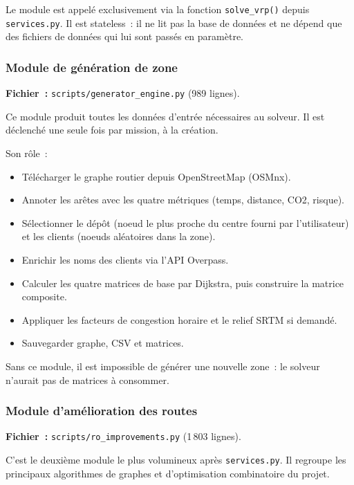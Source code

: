 \documentclass[a4paper, 12pt, twoside]{article}
\begin{document}
Le module est appel\'{e} exclusivement via la fonction \texttt{solve\_vrp()} depuis
\texttt{services.py}. Il est stateless~: il ne lit pas la base de donn\'{e}es et ne
d\'{e}pend que des fichiers de donn\'{e}es qui lui sont pass\'{e}s en param\`{e}tre.

\subsubsection{Module de g\'{e}n\'{e}ration de zone}

\textbf{Fichier~:} \texttt{scripts/generator\_engine.py} (989 lignes).

Ce module produit toutes les donn\'{e}es d'entr\'{e}e n\'{e}cessaires au solveur.
Il est d\'{e}clench\'{e} une seule fois par mission, \`{a} la cr\'{e}ation.

Son r\^{o}le~:
\begin{itemize}
  \item T\'{e}l\'{e}charger le graphe routier depuis OpenStreetMap (OSMnx).
  \item Annoter les ar\^{e}tes avec les quatre m\'{e}triques (temps, distance, CO2, risque).
  \item S\'{e}lectionner le d\'{e}p\^{o}t (noeud le plus proche du centre fourni par l'utilisateur) et les clients (noeuds al\'{e}atoires dans la zone).
  \item Enrichir les noms des clients via l'API Overpass.
  \item Calculer les quatre matrices de base par Dijkstra, puis construire la matrice composite.
  \item Appliquer les facteurs de congestion horaire et le relief SRTM si demand\'{e}.
  \item Sauvegarder graphe, CSV et matrices.
\end{itemize}

Sans ce module, il est impossible de g\'{e}n\'{e}rer une nouvelle zone~: le solveur
n'aurait pas de matrices \`{a} consommer.

\subsubsection{Module d'am\'{e}lioration des routes}

\textbf{Fichier~:} \texttt{scripts/ro\_improvements.py} (1\,803 lignes).

C'est le deuxi\`{e}me module le plus volumineux apr\`{e}s \texttt{services.py}. Il regroupe
les principaux algorithmes de graphes et d'optimisation combinatoire du projet.
\end{document}
